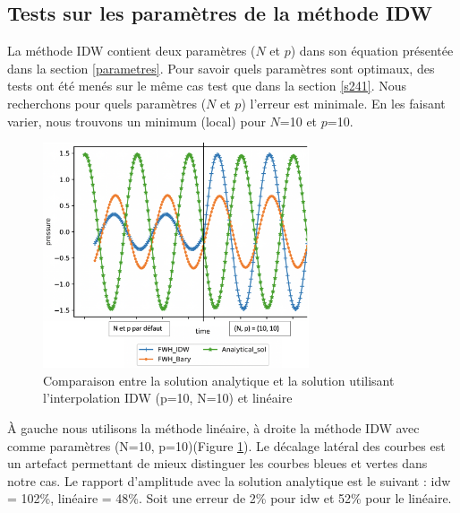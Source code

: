 \newpage

\subsection{Tests sur les paramètres de la méthode IDW} \label{s244}

La méthode IDW contient deux paramètres (\(N\) et \(p\)) dans son équation présentée dans la section \ref{parametres}.
Pour savoir quels paramètres sont optimaux, des tests ont été menés sur le même cas test que dans la section \ref{s241}.
Nous recherchons pour quels paramètres (\(N\) et \(p\)) l'erreur est minimale.
En les faisant varier, nous trouvons un minimum (local) pour \(N\)=10 et \(p\)=10.

\begin{figure}[H]
    \centering
    \includegraphics[width=0.70\textwidth]{images/rapport_a_np.png}
    \caption{Comparaison entre la solution analytique et la solution utilisant l'interpolation IDW (p=10, N=10) et linéaire}
    \label{fig:np10}
\end{figure}

À gauche nous utilisons la méthode linéaire, à droite la méthode IDW avec comme paramètres (N=10, p=10)(Figure \ref{fig:np10}). Le décalage latéral des courbes est un artefact permettant de mieux distinguer les courbes bleues et vertes dans notre cas.
Le rapport d'amplitude avec la solution analytique est le suivant : idw = 102\%, linéaire = 48\%. Soit une erreur de 2\% pour idw et 52\% pour le linéaire. %






